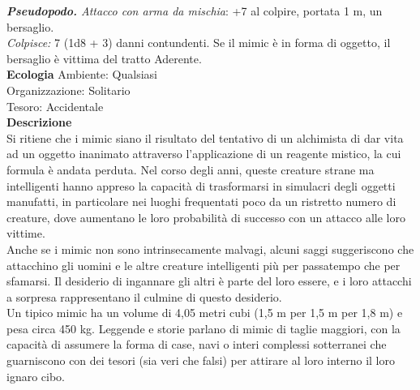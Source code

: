 \begin{multicols}{2}
\emph{\textbf{Pseudopodo.} Attacco con arma da mischia}: +7 al colpire, portata 1 m, un bersaglio.\\
\emph{Colpisce:} 7 (1d8 + 3) danni contundenti. Se il mimic è in forma di oggetto, il bersaglio è vittima del tratto Aderente.\\
\textbf{Ecologia}
Ambiente: Qualsiasi\\
Organizzazione: Solitario\\
Tesoro: Accidentale\\
\textbf{Descrizione}\\
Si ritiene che i mimic siano il risultato del tentativo di un alchimista di dar vita ad un oggetto inanimato attraverso l'applicazione di un reagente mistico, la cui formula è andata perduta. Nel corso degli anni, queste creature strane ma intelligenti hanno appreso la capacità di trasformarsi in simulacri degli oggetti manufatti, in particolare nei luoghi frequentati poco da un ristretto numero di creature, dove aumentano le loro probabilità di successo con un attacco alle loro vittime.\\
Anche se i mimic non sono intrinsecamente malvagi, alcuni saggi suggeriscono che attacchino gli uomini e le altre creature intelligenti più per passatempo che per sfamarsi. Il desiderio di ingannare gli altri è parte del loro essere, e i loro attacchi a sorpresa rappresentano il culmine di questo desiderio.\\
Un tipico mimic ha un volume di 4,05 metri cubi (1,5 m per 1,5 m per 1,8 m) e pesa circa 450 kg. Leggende e storie parlano di mimic di taglie maggiori, con la capacità di assumere la forma di case, navi o interi complessi sotterranei che guarniscono con dei tesori (sia veri che falsi) per attirare al loro interno il loro ignaro cibo.\\


\end{multicols}
